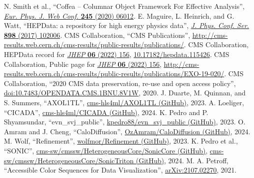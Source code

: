 \begin{thebibliography}{99}
 N. Smith et al., ``Coffea -- Columnar Object Framework For Effective Analysis'', \href{https://doi.org/10.1051/epjconf/202024506012}{\textit{Eur. Phys. J. Web Conf.} \textbf{245} (2020) 06012}.
 E. Maguire, L. Heinrich, and G. Watt, ``HEPData: a repository for high energy physics data'', \href{https://doi.org/10.1088/1742-6596/898/10/102006}{\textit{J. Phys. Conf. Ser.} \textbf{898} (2017) 102006}.
 CMS Collaboration, ``CMS Publications'', \href{http://cms-results.web.cern.ch/cms-results/public-results/publications/}{http://cms-results.web.cern.ch/cms-results/public-results/publications/}.
 CMS Collaboration, HEPData record for \href{https://doi.org/10.1007/JHEP06(2022)156}{\textit{JHEP} \textbf{06} (2022) 156}, \href{https://doi.org/10.17182/hepdata.115426}{10.17182/hepdata.115426}.
 CMS Collaboration, Public page for \href{https://doi.org/10.1007/JHEP06(2022)156}{\textit{JHEP} \textbf{06} (2022) 156}, \href{http://cms-results.web.cern.ch/cms-results/public-results/publications/EXO-19-020/}{http://cms-results.web.cern.ch/cms-results/public-results/publications/EXO-19-020/}.
 CMS Collaboration, ``2020 CMS data preservation, re-use and open access policy'', \href{http://doi.org/10.7483/OPENDATA.CMS.1BNU.8V1W}{doi:10.7483/OPENDATA.CMS.1BNU.8V1W}, 2020.
 J. Duarte, M. Quinnan, and S. Summers, ``AXOL1TL'', \href{https://github.com/cms-hls4ml/AXOL1TL}{cms-hls4ml/AXOL1TL (GitHub)}, 2023.
 A. Loeliger, ``CICADA'', \href{https://github.com/cms-hls4ml/CICADA}{cms-hls4ml/CICADA (GitHub)}, 2024.
 K. Pedro and P. Shyamsundar, ``evn\_svj\_public'', \href{https://github.com/kpedro88/evn_svj_public}{kpedro88/evn\_svj\_public (GitHub)}, 2023.
 O. Amram and J. Cheng, ``CaloDiffusion'', \href{https://github.com/OzAmram/CaloDiffusion}{OzAmram/CaloDiffusion (GitHub)}, 2024.
 M. Wolf, ``Refinement'', \href{https://github.com/wolfmor/Refinement}{wolfmor/Refinement (GitHub)}, 2023.
 K. Pedro et al., ``SONIC'', \href{https://github.com/cms-sw/cmssw/tree/master/HeterogeneousCore/SonicCore}{cms-sw/cmssw/HeterogeneousCore/SonicCore (GitHub)}, \href{https://github.com/cms-sw/cmssw/tree/master/HeterogeneousCore/SonicTriton}{cms-sw/cmssw/HeterogeneousCore/SonicTriton (GitHub)}, 2024.
 M. A. Petroff, ``Accessible Color Sequences for Data Visualization'', \href{https://arxiv.org/abs/2107.02270}{arXiv:2107.02270}, 2021.
\end{thebibliography}
